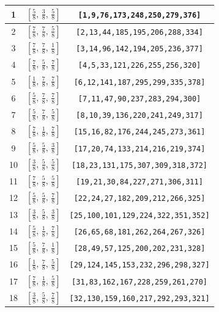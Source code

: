 \documentclass[fleqn,8pt]{jsarticle}
\begin{document}
\begin{longtable}{ccc}
1 & $\left[ \frac{5}{8},\, \frac{3}{8},\, \frac{5}{8} \right]$ & {\tt [1,9,76,173,248,250,279,376]} \\ \hline
2 & $\left[ \frac{7}{8},\, \frac{7}{8},\, \frac{5}{8} \right]$ & {\tt [2,13,44,185,195,206,288,334]} \\ \hline
3 & $\left[ \frac{7}{8},\, \frac{7}{8},\, \frac{1}{8} \right]$ & {\tt [3,14,96,142,194,205,236,377]} \\ \hline
4 & $\left[ \frac{7}{8},\, \frac{5}{8},\, \frac{7}{8} \right]$ & {\tt [4,5,33,121,226,255,256,320]} \\ \hline
5 & $\left[ \frac{1}{8},\, \frac{7}{8},\, \frac{7}{8} \right]$ & {\tt [6,12,141,187,295,299,335,378]} \\ \hline
6 & $\left[ \frac{5}{8},\, \frac{7}{8},\, \frac{7}{8} \right]$ & {\tt [7,11,47,90,237,283,294,300]} \\ \hline
7 & $\left[ \frac{5}{8},\, \frac{7}{8},\, \frac{5}{8} \right]$ & {\tt [8,10,39,136,220,241,249,317]} \\ \hline
8 & $\left[ \frac{7}{8},\, \frac{1}{8},\, \frac{7}{8} \right]$ & {\tt [15,16,82,176,244,245,273,361]} \\ \hline
9 & $\left[ \frac{5}{8},\, \frac{5}{8},\, \frac{3}{8} \right]$ & {\tt [17,20,74,133,214,216,219,374]} \\ \hline
10 & $\left[ \frac{3}{8},\, \frac{5}{8},\, \frac{5}{8} \right]$ & {\tt [18,23,131,175,307,309,318,372]} \\ \hline
11 & $\left[ \frac{7}{8},\, \frac{5}{8},\, \frac{5}{8} \right]$ & {\tt [19,21,30,84,227,271,306,311]} \\ \hline
12 & $\left[ \frac{5}{8},\, \frac{5}{8},\, \frac{7}{8} \right]$ & {\tt [22,24,27,182,209,212,266,325]} \\ \hline
13 & $\left[ \frac{3}{8},\, \frac{5}{8},\, \frac{3}{8} \right]$ & {\tt [25,100,101,129,224,322,351,352]} \\ \hline
14 & $\left[ \frac{5}{8},\, \frac{1}{8},\, \frac{7}{8} \right]$ & {\tt [26,65,68,181,262,264,267,326]} \\ \hline
15 & $\left[ \frac{5}{8},\, \frac{7}{8},\, \frac{1}{8} \right]$ & {\tt [28,49,57,125,200,202,231,328]} \\ \hline
16 & $\left[ \frac{1}{8},\, \frac{7}{8},\, \frac{5}{8} \right]$ & {\tt [29,124,145,153,232,296,298,327]} \\ \hline
17 & $\left[ \frac{7}{8},\, \frac{1}{8},\, \frac{5}{8} \right]$ & {\tt [31,83,162,167,228,259,261,270]} \\ \hline
18 & $\left[ \frac{3}{8},\, \frac{5}{8},\, \frac{7}{8} \right]$ & {\tt [32,130,159,160,217,292,293,321]} \\ \hline

\end{longtable}
\end{document}
